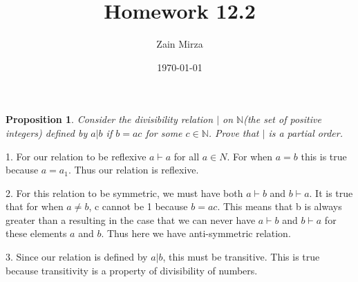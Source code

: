 \documentclass[12pt]{amsart}
\title{Homework 12.2}
\author{Zain Mirza}
\date{\today}
\newtheorem*{proposition}{Proposition}
\begin{document}
\maketitle
\begin{proposition}
Consider the divisibility relation $|$ on $\mathbb{N}$(the set of positive integers) defined by $a|b$ if $b=ac$ for some $c\in \mathbb{N} $. Prove that $|$ is a partial order.  
\end{proposition}

1. For our relation to be reflexive $a\vdash a$ for all $a\in N$. For when $a=b $ this is true because $a=a_1$. Thus our relation is reflexive.  

2. For this relation to be symmetric, we must have both $a\vdash b$ and $b\vdash a$. It is true that for when $a\neq b$, c cannot be 1 because $b=ac$. This means that b is always greater than a resulting in the case that we can never have $a\vdash b$ and $b\vdash a$ for these elements $a$ and $b$. Thus here we have anti-symmetric relation. 

3. Since our relation is defined by $a|b$, this must be transitive. This is true because transitivity is a property of divisibility of numbers. 
\end{document}
